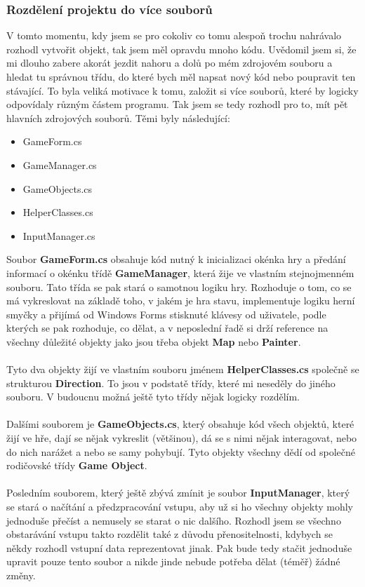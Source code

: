 \documentclass[a4]{article}
\begin{document}
\subsubsection{Rozdělení projektu do více souborů}
V tomto momentu, kdy jsem se pro cokoliv co tomu alespoň trochu nahrávalo rozhodl vytvořit objekt, tak jsem měl opravdu mnoho kódu. Uvědomil jsem si, že mi dlouho zabere akorát jezdit nahoru a dolů po mém zdrojovém souboru a hledat tu správnou třídu, do které bych měl napsat nový kód nebo poupravit ten stávající. To byla veliká motivace k tomu, založit si více souborů, které by logicky odpovídaly různým částem programu. Tak jsem se tedy rozhodl pro to, mít pět hlavních zdrojových souborů. Těmi byly následující:
\begin{itemize}
    \item GameForm.cs
    \item GameManager.cs
    \item GameObjects.cs
    \item HelperClasses.cs
    \item InputManager.cs
\end{itemize}
Soubor \textbf{GameForm.cs} obsahuje kód nutný k inicializaci okénka hry a předání informací o okénku třídě \textbf{GameManager}, která žije ve vlastním stejnojmenném souboru. Tato třída se pak stará o samotnou logiku hry. Rozhoduje o tom, co se má vykreslovat na základě toho, v jakém je hra stavu, implementuje logiku herní smyčky a přijímá od Windows Forms stisknuté klávesy od uživatele, podle kterých se pak rozhoduje, co dělat, a v neposlední řadě si drží reference na všechny důležité objekty jako jsou třeba objekt \textbf{Map} nebo \textbf{Painter}. 
\\\\
Tyto dva objekty žijí ve vlastním souboru jménem \textbf{HelperClasses.cs} společně se strukturou \textbf{Direction}. To jsou v podstatě třídy, které mi neseděly do jiného souboru. V budoucnu možná ještě tyto třídy nějak logicky rozdělím. 
\\\\
Dalšími souborem je \textbf{GameObjects.cs}, který obsahuje kód všech objektů, které žijí ve hře, dají se nějak vykreslit (většinou), dá se s nimi nějak interagovat, nebo do nich narážet a nebo se samy pohybují. Tyto objekty všechny dědí od společné rodičovské třídy \textbf{Game Object}. 
\\\\
Posledním souborem, který ještě zbývá zmínit je soubor \textbf{InputManager}, který se stará o načítání a předzpracování vstupu, aby už si ho všechny objekty mohly jednoduše přečíst a nemusely se starat o nic dalšího. Rozhodl jsem se všechno obstarávání vstupu takto rozdělit také z důvodu přenositelnosti, kdybych se někdy rozhodl vstupní data reprezentovat jinak. Pak bude tedy stačit jednoduše upravit pouze tento soubor a nikde jinde nebude potřeba dělat (téměř) žádné změny.
\end{document}
